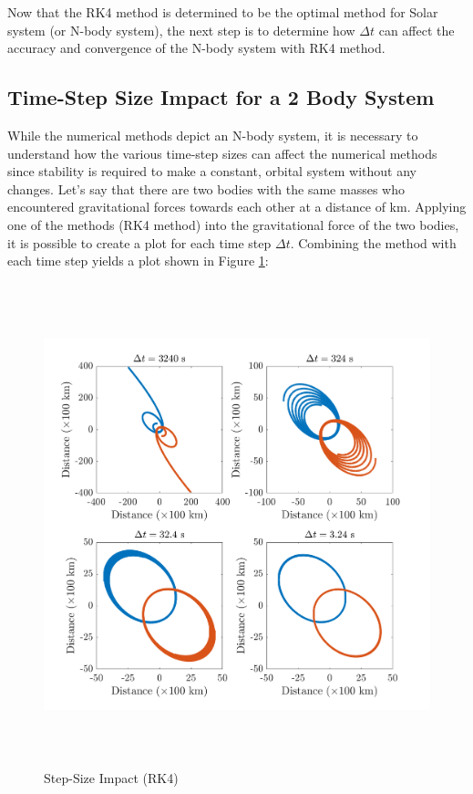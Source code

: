 \documentclass[conf]{new-aiaa}
\begin{document}
    Now that the RK4 method is determined to be the optimal method for Solar system (or N-body system), the next step is to determine how $\Delta t$ can affect the accuracy and convergence of the N-body system with RK4 method.
    
\subsection{Time-Step Size Impact for a 2 Body System}
    While the numerical methods depict an N-body system, it is necessary to understand how the various time-step sizes can affect the numerical methods since stability is required to make a constant, orbital system without any changes. Let's say that there are two bodies with the same masses who encountered gravitational forces towards each other at a distance of km. Applying one of the methods (RK4 method) into the gravitational force of the two bodies, it is possible to create a plot for each time step $\Delta t$. Combining the method with each time step yields a plot shown in Figure \ref{step}:
     \begin{figure}[H]
        \centering
        \includegraphics[height=14cm]{Figures/Implementation/N=2_Simulation.png}
        \caption{Step-Size Impact (RK4)}
        \label{step}
    \end{figure}
    
\end{document}
